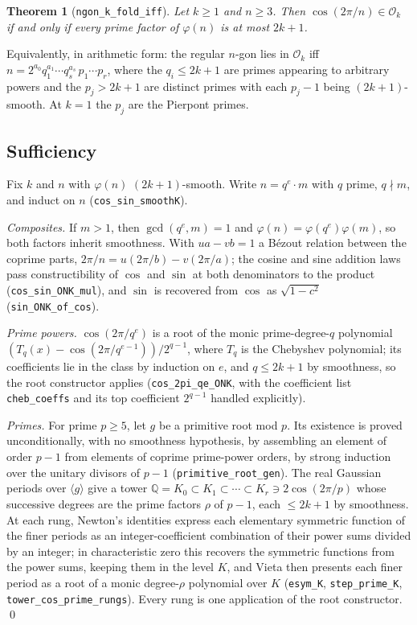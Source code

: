\documentclass[11pt]{amsart}
\theoremstyle{plain}
\newtheorem{theorem}{Theorem}[section]
\theoremstyle{definition}
\newcommand{\Ok}{\mathscr{O}_k}
\newcommand{\Q}{\mathbb{Q}}
\newcommand{\code}[1]{\texttt{#1}}
\begin{document}
\begin{theorem}[\code{ngon\_k\_fold\_iff}]\label{thm:main}
Let $k \ge 1$ and $n \ge 3$. Then $\cos(2\pi/n) \in \Ok$ if and only if every prime factor of $\varphi(n)$ is at most $2k+1$.
\end{theorem}

Equivalently, in arithmetic form: the regular $n$-gon lies in $\Ok$ iff $n = 2^{a_0} q_1^{a_1} \cdots q_s^{a_s}\, p_1 \cdots p_r$, where the $q_i \le 2k+1$ are primes appearing to arbitrary powers and the $p_j > 2k+1$ are distinct primes with each $p_j - 1$ being $(2k+1)$-smooth. At $k=1$ the $p_j$ are the Pierpont primes.

\subsection{Sufficiency}

Fix $k$ and $n$ with $\varphi(n)$ $(2k+1)$-smooth. Write $n = q^e \cdot m$ with $q$ prime, $q \nmid m$, and induct on $n$ (\code{cos\_sin\_smoothK}).

\emph{Composites.} If $m > 1$, then $\gcd(q^e, m) = 1$ and $\varphi(n) = \varphi(q^e)\varphi(m)$, so both factors inherit smoothness. With $ua - vb = 1$ a B\'ezout relation between the coprime parts, $2\pi/n = u(2\pi/b) - v(2\pi/a)$; the cosine and sine addition laws pass constructibility of $\cos$ and $\sin$ at both denominators to the product (\code{cos\_sin\_ONK\_mul}), and $\sin$ is recovered from $\cos$ as $\sqrt{1-c^2}$ (\code{sin\_ONK\_of\_cos}).

\emph{Prime powers.} $\cos(2\pi/q^e)$ is a root of the monic prime-degree-$q$ polynomial $(T_q(x) - \cos(2\pi/q^{e-1}))/2^{q-1}$, where $T_q$ is the Chebyshev polynomial; its coefficients lie in the class by induction on $e$, and $q \le 2k+1$ by smoothness, so the root constructor applies (\code{cos\_2pi\_qe\_ONK}, with the coefficient list \code{cheb\_coeffs} and its top coefficient $2^{q-1}$ handled explicitly).

\emph{Primes.} For prime $p \ge 5$, let $g$ be a primitive root mod $p$. Its existence is proved unconditionally, with no smoothness hypothesis, by assembling an element of order $p-1$ from elements of coprime prime-power orders, by strong induction over the unitary divisors of $p-1$ (\code{primitive\_root\_gen}). The real Gaussian periods over $\langle g \rangle$ give a tower $\Q = K_0 \subset K_1 \subset \cdots \subset K_r \ni 2\cos(2\pi/p)$ whose successive degrees are the prime factors $\rho$ of $p-1$, each $\le 2k+1$ by smoothness. At each rung, Newton's identities express each elementary symmetric function of the finer periods as an integer-coefficient combination of their power sums divided by an integer; in characteristic zero this recovers the symmetric functions from the power sums, keeping them in the level $K$, and Vieta then presents each finer period as a root of a monic degree-$\rho$ polynomial over $K$ (\code{esym\_K}, \code{step\_prime\_K}, \code{tower\_cos\_prime\_rungs}). Every rung is one application of the root constructor. \qed
\end{document}
